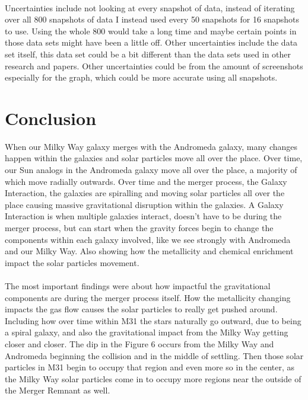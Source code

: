 \documentclass[fleqn,usenatbib]{mnras}
\begin{document}
\paragraph{}

Uncertainties include not looking at every snapshot of data, instead of iterating over all 800 snapshots of data I instead used every 50 snapshots for 16 snapshots to use. Using the whole 800 would take a long time and maybe certain points in those data sets might have been a little off. Other uncertainties include the data set itself, this data set could be a bit different than the data sets used in other research and papers. Other uncertainties could be from the amount of screenshots especially for the graph, which could be more accurate using all snapshots.


\section{Conclusion}

When our Milky Way galaxy merges with the Andromeda galaxy, many changes happen within the galaxies and solar particles move all over the place. Over time, our Sun analogs in the Andromeda galaxy move all over the place, a majority of which move radially outwards. Over time and the merger process, the Galaxy Interaction, the galaxies are spiralling and moving solar particles all over the place causing massive gravitational disruption within the galaxies. A Galaxy Interaction is when multiple galaxies interact, doesn't have to be during the merger process, but can start when the gravity forces begin to change the components within each galaxy involved, like we see strongly with Andromeda and our Milky Way. Also showing how the metallicity and chemical enrichment impact the solar particles movement. 

\paragraph{}

The most important findings were about how impactful the gravitational components are during the merger process itself. How the metallicity changing impacts the gas flow causes the solar particles to really get pushed around. Including how over time within M31 the stars naturally go outward, due to being a spiral galaxy, and also the gravitational impact from the Milky Way getting closer and closer. The dip in the Figure 6 occurs from the Milky Way and Andromeda beginning the collision and in the middle of settling. Then those solar particles in M31 begin to occupy that region and even more so in the center, as the Milky Way solar particles come in to occupy more regions near the outside of the Merger Remnant as well. 
\end{document}
